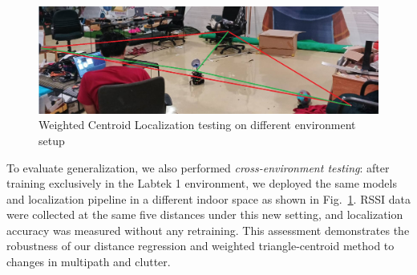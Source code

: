 \begin{figure}[!b]
  \centering
  \includegraphics[width=0.75\linewidth]{img/rssi.jpg}
  \caption{Weighted Centroid Localization testing on different environment setup}
  \label{fig:environment}
\end{figure}

To evaluate generalization, we also performed \emph{cross-environment testing}: after training exclusively in the Labtek 1 environment, we deployed the same models and localization pipeline in a different indoor space as shown in Fig.~\ref{fig:environment}. RSSI data were collected at the same five distances under this new setting, and localization accuracy was measured without any retraining. This assessment demonstrates the robustness of our distance regression and weighted triangle-centroid method to changes in multipath and clutter.
